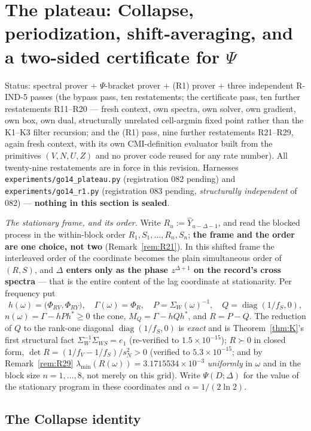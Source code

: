 \documentclass[11pt]{article}
\theoremstyle{definition}
\theoremstyle{remark}
\begin{document}
\section{The plateau: Collapse, periodization, shift-averaging, and a
two-sided certificate for $\Psi$}
\label{sec:plateau}
Status: spectral prover $+$ $\Psi$-bracket prover $+$ (R1) prover $+$
three independent R-IND-5 passes (the bypass pass, ten restatements;
the certificate
pass, ten further restatements R11--R20 --- fresh context, own spectra,
own solver, own gradient, own box, own dual, structurally unrelated
cell-argmin fixed point rather than the K1--K3 filter recursion; and
the (R1) pass, nine further restatements R21--R29, again fresh context,
with its own CMI-definition evaluator built from the primitives
$(V,N,U,Z)$ and no prover code reused for any rate number). All
twenty-nine restatements are in force in this revision. Harnesses
\texttt{experiments/\allowbreak go14\_plateau.py} (registration 082
pending) and \texttt{experiments/\allowbreak go14\_r1.py} (registration
083 pending, \emph{structurally independent} of 082) ---
\textbf{nothing in this section is sealed}.

\emph{The stationary frame, and its order.} Write
$R_u:=\hat Y_{u-\Delta-1}$, and read the blocked process in the
within-block order $R_1,S_1,\dots,R_n,S_n$; \textbf{the frame and the
order are one choice, not two} (Remark~\ref{rem:R21}). In this
shifted frame the interleaved order of the coordinate becomes the plain
simultaneous order of $(R,S)$, and \textbf{$\Delta$ enters only as the
phase $z^{\Delta+1}$ on the record's cross spectra} --- that is the
entire content of the lag coordinate at stationarity. Per frequency put
\[
h(\omega)=\bigl(\Phi_{RV},\Phi_{RY}\bigr),\quad
\Gamma(\omega)=\Phi_R,\quad
P=\Sigma_W(\omega)^{-1},\quad
Q=\operatorname{diag}(1/f_S,0),
\]
$n(\omega)=\Gamma-hPh^\ast\ge0$ the cone, $M_Q=\Gamma-hQh^\ast$, and
$R=P-Q$. The reduction of $Q$ to the rank-one diagonal
$\operatorname{diag}(1/f_S,0)$ is \emph{exact} and is
Theorem~\ref{thm:K}'s first structural fact
$\Sigma_W^{-1}\Sigma_{WS}=e_1$ (re-verified to $1.5\times10^{-15}$);
$R\succ0$ in closed form, $\det R=(1/f_V-1/f_S)/s_N^2>0$ (verified to
$5.3\times10^{-15}$; and by Remark~\ref{rem:R29}
$\lambda_{\min}(R(\omega))=3.1715534\times10^{-3}$ \emph{uniformly} in
$\omega$ and in the block size $n=1,\dots,8$, not merely on this
grid). Write $\Psi(D;\Delta)$ for the value of the stationary program
in these coordinates and $\alpha=1/(2\ln2)$.

\subsection{The Collapse identity}
\end{document}
